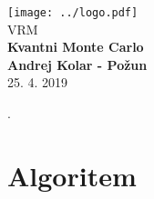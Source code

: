\documentclass{article}
\begin{document}
\begin{titlepage}
    \begin{center}
        \vspace*{1cm}
        \Large
\texttt{[image: ../logo.pdf]}\\
        \Large
\vspace{1cm}
        VRM\\
        \huge
        \textbf{Kvantni Monte Carlo\\}
\Large  
        \vspace{1cm}
        \textbf{Andrej Kolar - Po{\v z}un\\}
        \vspace{0.8cm}
 25. 4. 2019

\vfill
\normalsize
\end{center}. 
\end{titlepage}
\newpage
{}
\section*{Algoritem}
\end{document}
